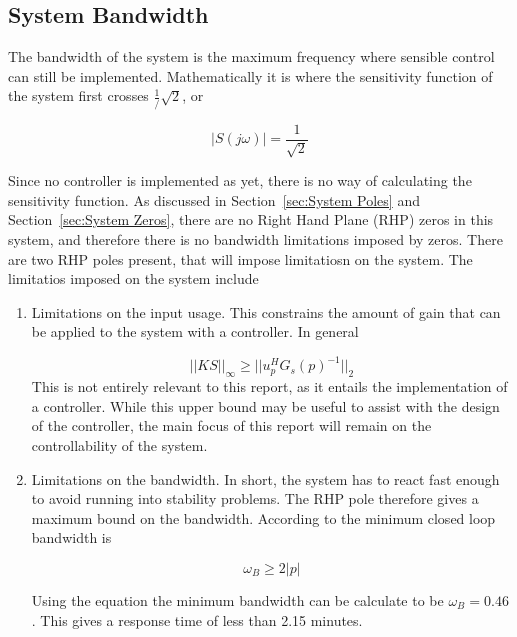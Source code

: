 \subsection{System Bandwidth}
\label{sec:Bandwidths}

The bandwidth of the system is the maximum frequency where sensible control can still be implemented. Mathematically it is where the sensitivity function of the system first crosses $\frac{1}/{\sqrt{2}}$, or

\begin{equation}
	|S(j\omega)| = \frac{1}{\sqrt{2}}
\end{equation}

Since no controller is implemented as yet, there is no way of calculating the sensitivity function. As discussed in Section~\ref{sec:System Poles} and Section~\ref{sec:System Zeros}, there are no Right Hand Plane (RHP) zeros in this system, and therefore there is no bandwidth limitations imposed by zeros. There are two RHP poles present, that will impose limitatiosn on the system. The limitatios imposed on the system include

\begin{enumerate}
	\item Limitations on the input usage. This constrains the amount of gain that can be applied to the system with a controller. In general
	
	\begin{equation}
		||KS||_{\infty} \geq ||u^H_p G_s(p)^{-1}||_2
	\end{equation}
	This is not entirely relevant to this report, as it entails the implementation of a controller. While this upper bound may be useful to assist with the design of the controller, the main focus of this report will remain on the controllability of the system.
	
	\item Limitations on the bandwidth. In short, the system has to react fast enough to avoid running into stability problems. The RHP pole therefore gives a maximum bound on the bandwidth. According to \textcite{skogestad} the minimum closed loop bandwidth is 
	
	\begin{equation}
		\omega_B \geq 2|p|
	\end{equation}
	
	Using the equation the minimum bandwidth can be calculate to be $\omega_B = 0.46$. This gives a response time of less than 2.15 minutes.
\end{enumerate}

